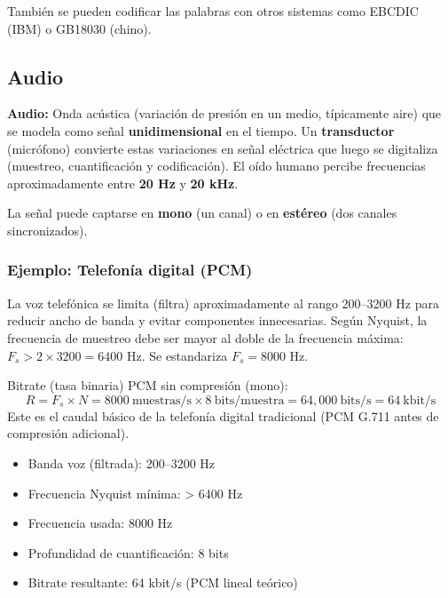 \documentclass[11pt,a4paper]{article}
\begin{document}
También se pueden codificar las palabras con otros sistemas como EBCDIC (IBM) o GB18030 (chino).

\subsection{Audio}

\begin{DefBox}
\textbf{Audio:} Onda acústica (variación de presión en un medio, típicamente aire) que se modela como señal \textbf{unidimensional} en el tiempo. Un \textbf{transductor} (micrófono) convierte estas variaciones en señal eléctrica que luego se digitaliza (muestreo, cuantificación y codificación). El oído humano percibe frecuencias aproximadamente entre \textbf{20 Hz} y \textbf{20 kHz}.
\end{DefBox}

\begin{NotaBox}
La señal puede captarse en \textbf{mono} (un canal) o en \textbf{estéreo} (dos canales sincronizados).
\end{NotaBox}

\subsubsection*{Ejemplo: Telefonía digital (PCM)}
\begin{DefBox}
La voz telefónica se limita (filtra) aproximadamente al rango 200--3200 Hz para reducir ancho de banda y evitar componentes innecesarias. Según Nyquist, la frecuencia de muestreo debe ser mayor al doble de la frecuencia máxima: $F_s > 2 \times 3200 = 6400$ Hz. Se estandariza $F_s = 8000$ Hz.
\end{DefBox}

\begin{NotaBox}
Bitrate (tasa binaria) PCM sin compresión (mono):
\[
R = F_s \times N = 8000\ \text{muestras/s} \times 8\ \text{bits/muestra} = 64{,}000\ \text{bits/s} = 64\ \text{kbit/s}
\]
Este es el caudal básico de la telefonía digital tradicional (PCM G.711 antes de compresión adicional).
\end{NotaBox}

\begin{ChecklistBox}
\begin{itemize}
	\item Banda voz (filtrada): 200--3200 Hz
	\item Frecuencia Nyquist mínima: > 6400 Hz
	\item Frecuencia usada: 8000 Hz
	\item Profundidad de cuantificación: 8 bits
	\item Bitrate resultante: 64 kbit/s (PCM lineal teórico)
\end{itemize}
\end{ChecklistBox}
\end{document}
